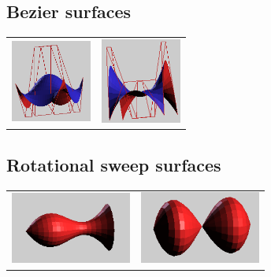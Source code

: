 \documentclass[12pt,a4paper]{scrartcl}
\begin{document}
\subsection{Bezier surfaces}
\begin{center}
	\begin{tabular}{cc}
		\includegraphics[width=100px]{Images/bezier-01.png} 
		& \includegraphics[width=100px]{Images/bezier-02.png}  \\
	\end{tabular}
\end{center}

\subsection{Rotational sweep surfaces}
\begin{center}
		\begin{tabular}{cc}
		\includegraphics[width=150px]{Images/sweep-01.png} 
		& \includegraphics[width=150px]{Images/sweep-02.png}  \\
	\end{tabular}
\end{center}
\end{document}
